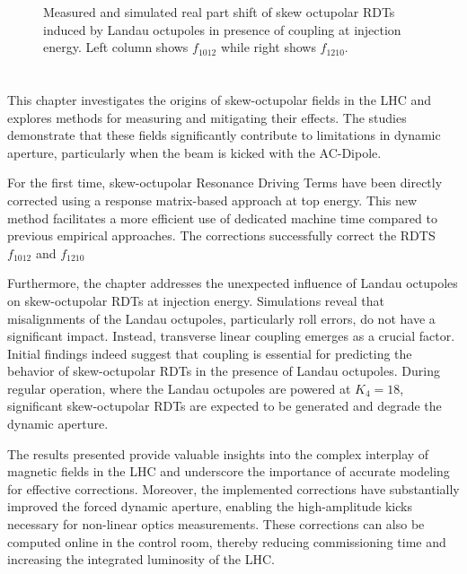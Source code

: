 \begin{figure}[!htb]
\begin{subfigure}{0.47\textwidth}
    \end{subfigure}
    \caption{Measured and simulated real part shift of skew octupolar RDTs induced by Landau
    octupoles in presence of coupling at injection energy. Left column shows $f_{1012}$ while right
    shows $f_{1210}$.}
    \label{fig:skew_octupolar:response_meas_sim_coupling}
\end{figure}


\FloatBarrier
\section{}

This chapter investigates the origins of skew-octupolar fields in the LHC and explores methods for
measuring and mitigating their effects. The studies demonstrate that these fields significantly
contribute to limitations in dynamic aperture, particularly when the beam is kicked with the
AC-Dipole. 

For the first time, skew-octupolar Resonance Driving Terms have been directly corrected using
a response matrix-based approach at top energy. This new method facilitates a more efficient use of
dedicated machine time compared to previous empirical approaches. The corrections successfully
correct the RDTS $f_{1012}$ and $f_{1210}$

Furthermore, the chapter addresses the unexpected influence of Landau octupoles on skew-octupolar
RDTs at injection energy. Simulations reveal that misalignments of the Landau octupoles,
particularly roll errors, do not have a significant impact. Instead, transverse linear coupling
emerges as a crucial factor.
Initial findings indeed suggest that coupling is essential for predicting the behavior of
skew-octupolar RDTs in the presence of Landau octupoles. During regular operation, where the Landau
octupoles are powered at $K_4 = 18$, significant skew-octupolar RDTs are expected to be generated
and degrade the dynamic aperture.

The results presented provide valuable insights into the complex interplay of magnetic fields in the
LHC and underscore the importance of accurate modeling for effective corrections. Moreover, the
implemented corrections have substantially improved the forced dynamic aperture, enabling the
high-amplitude kicks necessary for non-linear optics measurements. These corrections can also be
computed online in the control room, thereby reducing commissioning time and increasing the
integrated luminosity of the LHC.
